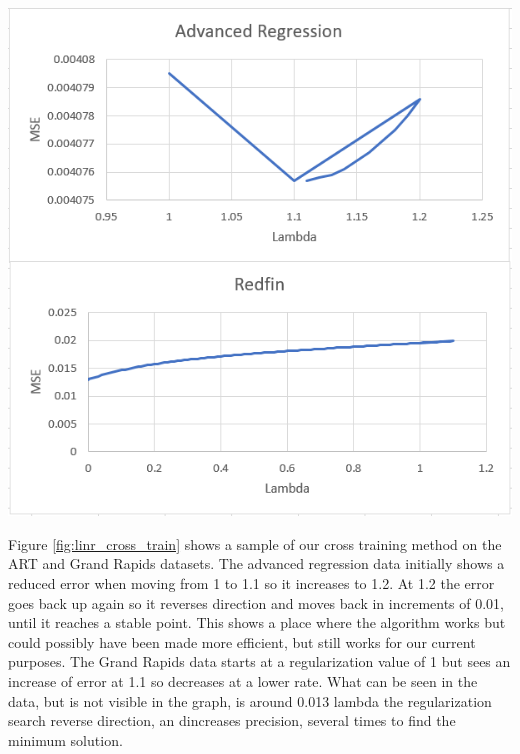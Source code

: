 \documentclass[10pt]{article}
\begin{document}
\begin{multicols}{2}
		\begin{center}
            \captionsetup{type=figure}
			\includegraphics[scale=0.60]{Images/LinearRegressionCrossTrain} \\
			\label{fig:linr_cross_train}
		\end{center}

        Figure \ref{fig:linr_cross_train} shows a sample of our cross training method on the ART and Grand Rapids datasets. The advanced regression data initially shows a reduced error when moving from 1 to 1.1 so it increases to 1.2.  At 1.2 the error goes back up again so it reverses direction and moves back in increments of 0.01, until it reaches a stable point. This shows a place where the algorithm works but could possibly have been made more efficient, but still works for our current purposes. The Grand Rapids data starts at a regularization value of 1 but sees an increase of error at 1.1 so decreases at a lower rate. What can be seen in the data, but is not visible in the graph, is around 0.013 lambda the regularization search reverse direction, an dincreases precision, several times to find the minimum solution.


\end{multicols}
\end{document}
